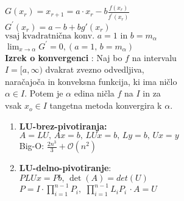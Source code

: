 \documentclass[12pt]{amsart}
\theoremstyle{plain}
\begin{document}
\begin{enumerate}
  $G(x_r) = x_{r+1} = a\cdot x_r - b \frac{f(x_r)}{f^{'}(x_r)} $ \\
  $G^{'}(x_r) = a - b + b g'(x_r) $ \\ 
  $\text{vsaj kvadratnična konv.  $a=1$ in $b=m_\alpha$}$ \\
  $\lim_{x \to \alpha} G^{'} = 0, (a=1, \, b=m_{\alpha})$ \\
  \textbf{ Izrek o konvergenci }: Naj bo $f$ na intervalu \\ 
  $I = [a, \infty)$ dvakrat zvezno odvedljiva, \\
  naračajoča in konveksna funkcija, ki ima ničlo \\
  $\alpha \in I$. Potem je $\alpha$ edina ničla $f$ na $I$ in za \\ 
  vsak $x_o \in I$ tangetna metoda konvergira k $\alpha$.

\end{enumerate}
\newpage

\begin{enumerate}
  \item \textbf{ LU-brez-pivotiranja: } \\
  $ A = LU, \, Ax =b, \, LUx=b, \, Ly=b, \, Ux = y$ \\
  Big-O: $\frac{2n^3}{3} + \mathcal{O}(n^2)$
  \item \textbf{LU-delno-pivotiranje}: \\
  $PLUx=Pb, \, \det(A)=det(U)$ \\
  $P= I \cdot \prod_{i=1}^{n-1} P_i ,\,\, \prod_{i=1}^{n-1} L_iP_i \, \cdot A = U$
\end{enumerate}
\end{document}
